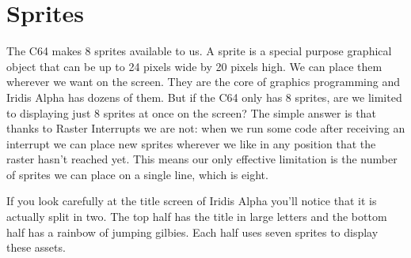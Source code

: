 \section{Sprites}
The C64 makes 8 sprites available to us. A sprite is a special purpose graphical object that
can be up to 24 pixels wide by 20 pixels high. We can place them wherever we want on the
screen. They are the core of graphics programming and Iridis Alpha has dozens of them. But
if the C64 only has 8 sprites, are we limited to displaying just 8 sprites at once on the
screen? The simple answer is that thanks to Raster Interrupts we are not: when we run
some code after receiving an interrupt we can place new sprites wherever we like in any
position that the raster hasn't reached yet. This means our only effective limitation is
the number of sprites we can place on a single line, which is eight. 

If you look carefully at the title screen of Iridis Alpha you'll notice that it is actually
split in two. The top half has the title in large letters and the bottom half has a rainbow
of jumping gilbies. Each half uses seven sprites to display these assets.


